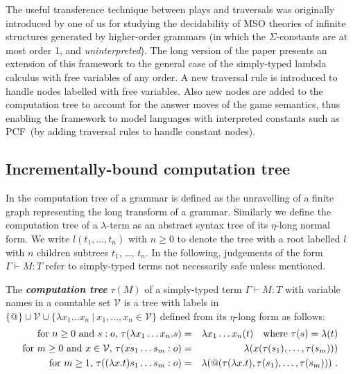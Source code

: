 \documentclass{llncs}
\newcommand\defname[1]{{\bf\em #1}\index{#1}}
\newcommand\union{\cup}
\newcommand\pcf{\textsf{PCF}}
\begin{document}
The useful transference technique between plays and traversals was
originally introduced by one of us \cite{OngLics2006} for studying the
decidability of MSO theories of infinite structures generated by
higher-order grammars (in which the $\Sigma$-constants are at most
order 1, and \emph{uninterpreted}).
The long version of the paper presents an extension of this framework to the general case of the simply-typed lambda calculus with free variables of any order. A new traversal rule is introduced to handle nodes labelled with free variables. Also new nodes are added to the computation tree to account for the answer moves of the game semantics, thus enabling the framework to model languages with interpreted constants such as \pcf~(by adding traversal rules to handle constant nodes).

\subsection*{Incrementally-bound computation tree}
In \cite{OngLics2006} the computation tree of a grammar is defined as
the unravelling of a finite graph representing the long transform of a
grammar. Similarly we define the computation tree of a $\lambda$-term
as an abstract syntax tree of its $\eta$-long normal form.  We write
$l(t_1, \ldots, t_n)$ with $n \geq 0$ to denote the tree with a root labelled $l$ with $n$ children subtrees $t_1$, \ldots, $t_n$.
In the following, judgements of the form $\Gamma \vdash M:T$
refer to simply-typed terms not necessarily safe unless  mentioned.

\begin{definition}\rm
\label{dfn:comptree}
  The \defname{computation tree} $\tau(M)$ of a simply-typed term
  $\Gamma \vdash M:T$ with variable names in a countable set
  $\mathcal{V}$ is a tree with labels in $ \{ @ \} \union \mathcal{V}
  \union \{ \lambda x_1 \ldots x_n \ | \ x_1 ,\ldots, x_n \in
  \mathcal{V} \}$ defined from its $\eta$-long form as follows:
\begin{eqnarray*}
  \mbox{for $n\geq 0$ and $s:o$, } \tau(\lambda x_1 \ldots x_n . s) &=& \lambda x_1 \ldots x_n(t) \mbox{\quad where $\tau(s) = \lambda(t)$}\\
  \mbox{for $m\geq 0$ and $x \in  \mathcal{V}$, } \tau( x s_1 \ldots s_m : o) &=&  \lambda (x(\tau(s_1),\ldots,\tau(s_m)))\\
  \mbox{for $m \geq 1$, } \tau((\lambda x.t) s_1 \ldots s_m :o) &=& \lambda (@(\tau(\lambda x.t),\tau(s_1),\ldots,\tau(s_m))) \ .
\end{eqnarray*}
\end{definition}
\end{document}
